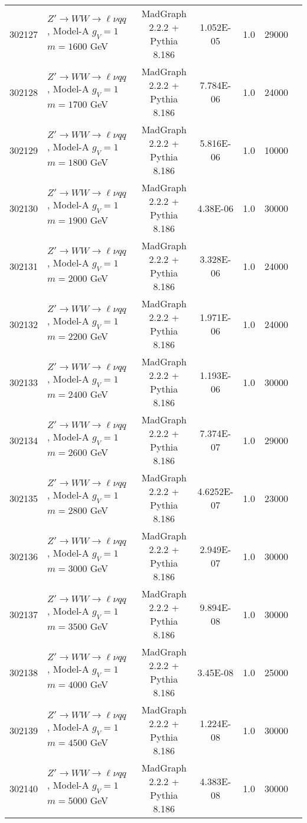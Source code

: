 \begin{landscape}
\begin{table}[!htb]
\begin{footnotesize}
\begin{center}
\begin{tabular}{|c|l|c|c|c|c|r|}
					302127 & $Z' \to WW \to \ell\nu qq $ , Model-A $g_V=1$ $m=1600$ GeV& MadGraph 2.2.2 + Pythia 8.186 & 1.052E-05  &1.0& 29000 \\
					302128 & $Z' \to WW \to \ell\nu qq $ , Model-A $g_V=1$ $m=1700$ GeV& MadGraph 2.2.2 + Pythia 8.186 & 7.784E-06  &1.0& 24000 \\
					302129 & $Z' \to WW \to \ell\nu qq $ , Model-A $g_V=1$ $m=1800$ GeV& MadGraph 2.2.2 + Pythia 8.186 & 5.816E-06  &1.0& 10000 \\
					302130 & $Z' \to WW \to \ell\nu qq $ , Model-A $g_V=1$ $m=1900$ GeV& MadGraph 2.2.2 + Pythia 8.186 & 4.38E-06   &1.0& 30000 \\
					302131 & $Z' \to WW \to \ell\nu qq $ , Model-A $g_V=1$ $m=2000$ GeV& MadGraph 2.2.2 + Pythia 8.186 & 3.328E-06  &1.0& 24000 \\
					302132 & $Z' \to WW \to \ell\nu qq $ , Model-A $g_V=1$ $m=2200$ GeV& MadGraph 2.2.2 + Pythia 8.186 & 1.971E-06  &1.0& 24000 \\
					302133 & $Z' \to WW \to \ell\nu qq $ , Model-A $g_V=1$ $m=2400$ GeV& MadGraph 2.2.2 + Pythia 8.186 & 1.193E-06  &1.0& 30000 \\
					302134 & $Z' \to WW \to \ell\nu qq $ , Model-A $g_V=1$ $m=2600$ GeV& MadGraph 2.2.2 + Pythia 8.186 & 7.374E-07  &1.0& 29000 \\
					302135 & $Z' \to WW \to \ell\nu qq $ , Model-A $g_V=1$ $m=2800$ GeV& MadGraph 2.2.2 + Pythia 8.186 & 4.6252E-07 &1.0& 23000 \\
					302136 & $Z' \to WW \to \ell\nu qq $ , Model-A $g_V=1$ $m=3000$ GeV& MadGraph 2.2.2 + Pythia 8.186 & 2.949E-07  &1.0& 30000 \\
					302137 & $Z' \to WW \to \ell\nu qq $ , Model-A $g_V=1$ $m=3500$ GeV& MadGraph 2.2.2 + Pythia 8.186 & 9.894E-08  &1.0& 30000 \\
					302138 & $Z' \to WW \to \ell\nu qq $ , Model-A $g_V=1$ $m=4000$ GeV& MadGraph 2.2.2 + Pythia 8.186 & 3.45E-08   &1.0& 25000 \\
					302139 & $Z' \to WW \to \ell\nu qq $ , Model-A $g_V=1$ $m=4500$ GeV& MadGraph 2.2.2 + Pythia 8.186 & 1.224E-08  &1.0& 30000 \\
					302140 & $Z' \to WW \to \ell\nu qq $ , Model-A $g_V=1$ $m=5000$ GeV& MadGraph 2.2.2 + Pythia 8.186 & 4.383E-08  &1.0& 30000 \\
					\hline
				\end{tabular}
			\end{center}
		\end{footnotesize}
	\end{table}
	

\end{landscape}
